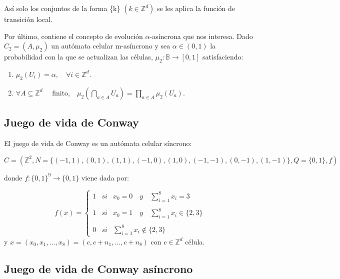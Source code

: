 \documentclass[../proyecto.tex]{memoir}
\begin{document}
Así solo los conjuntos de la forma \{k\} $(k \in \mathds{Z}^{d})$ se les aplica la función de transición local.

Por último, contiene el concepto de evolución $\alpha$-asíncrona que nos interesa. Dado $C_{2}=(A, \mu_{2})$ un autómata celular m-asíncrono y sea $\alpha \in (0,1)$ la probabilidad con la que se actualizan las células, $\mu_{2}: \mathds{B} \rightarrow [0,1]$ satisfaciendo:

\begin{enumerate}
\item $\mu_{2}(U_{i}) = \alpha, \quad \forall i \in \mathds{Z}^{d}$.
\item $ \forall A \subseteq \mathds{Z}^{d} \quad$ finito,$\quad  \mu_{2} ( \bigcap_{a \in A} U_{a} ) = \prod_{a \in A} \mu_{2} ( U_{a} )$.
\end{enumerate}


\subsection{Juego de vida de Conway}

El juego de vida de Conway es un autómata celular síncrono:

\begin{equation}
C = (\mathds{Z}^{2} , N=\{(-1, 1), (0, 1), (1, 1), (-1, 0), (1, 0), (-1,-1), (0,-1), (1,-1) \}, Q=\{0,1\}, f)
\end{equation}
 
donde $f:\{0,1\}^{9} \rightarrow \{0,1\} $ viene dada por:

\begin{equation}
f(x)= \left\{ \begin{array}{lcc}
             1 &   si  & x_{0}=0 \quad y \quad \sum_{i=1}^{8} x_i = 3 \\
             \\ 1 & si & x_{0}=1 \quad y \quad \sum_{i=1}^{8} x_i \in \{2 ,3\} \\
             \\ 0 &  si  & \sum_{i=1}^{8} x_i \notin \{2, 3\} \
             \end{array}
   \right. 
\end{equation}
y $x = (x_{0}, x_{1}, ...,x_{8}) = (c,c+n_{1},...,c+n_{8})$ con $c \in \mathds{Z} ^{d}$ célula.


\subsection{Juego de vida de Conway asíncrono}
\end{document}
